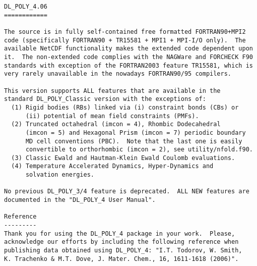 \label{readme}
\begin{verbatim}
DL_POLY_4.06
============

The source is in fully self-contained free formatted FORTRAN90+MPI2
code (specifically FORTRAN90 + TR15581 + MPI1 + MPI-I/O only).  The
available NetCDF functionality makes the extended code dependent upon
it.  The non-extended code complies with the NAGWare and FORCHECK F90
standards with exception of the FORTRAN2003 feature TR15581, which is
very rarely unavailable in the nowadays FORTRAN90/95 compilers.

This version supports ALL features that are available in the
standard DL_POLY_Classic version with the exceptions of:
  (1) Rigid bodies (RBs) linked via (i) constraint bonds (CBs) or
      (ii) potential of mean field constraints (PMFs).
  (2) Truncated octahedral (imcon = 4), Rhombic Dodecahedral
      (imcon = 5) and Hexagonal Prism (imcon = 7) periodic boundary
      MD cell conventions (PBC).  Note that the last one is easily
      convertible to orthorhombic (imcon = 2), see utility/nfold.f90.
  (3) Classic Ewald and Hautman-Klein Ewald Coulomb evaluations.
  (4) Temperature Accelerated Dynamics, Hyper-Dynamics and
      solvation energies.

No previous DL_POLY_3/4 feature is deprecated.  ALL NEW features are
documented in the "DL_POLY_4 User Manual".

Reference
---------
Thank you for using the DL_POLY_4 package in your work.  Please,
acknowledge our efforts by including the following reference when
publishing data obtained using DL_POLY_4: "I.T. Todorov, W. Smith,
K. Trachenko & M.T. Dove, J. Mater. Chem., 16, 1611-1618 (2006)".


\end{verbatim}
